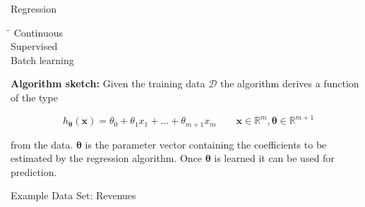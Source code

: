 \begin{frame}{Regression}{}
	\vspace*{-6mm}
	\begin{tabbing}
		\hspace*{7cm}\= \kill
					\> Continuous 		\\[1mm]
		 	\> Supervised 		\\[1mm]
					\> Batch learning		\\[1mm]
	\end{tabbing}
	
	\vspace*{-7mm}
	\footnotesize
	\begin{boxBlue}
		\textbf{Algorithm sketch:} Given the training data $\mathcal{D}$ the algorithm derives
		a function of the type
	
		\vspace*{-6mm}
		\begin{equation}
			h_{\bm{\theta}}(\bm{x}) = \theta_0 + \theta_1 x_1 + \dots + \theta_{m+1} x_{m}
				\qquad \bm{x} \in \mathbb{R}^{m}, \bm{\theta} \in \mathbb{R}^{m+1}
		\end{equation}

		from the data. $\bm{\theta}$ is the parameter vector containing the coefficients to be estimated by the regression
 		algorithm. Once $\bm{\theta}$ is learned it can be used for prediction. 
	\end{boxBlue}
\end{frame}


\begin{frame}{Example Data Set: Revenues}{}
\end{frame}


